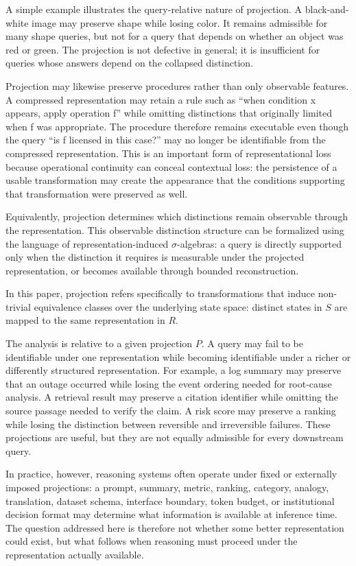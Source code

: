 \documentclass[11pt]{article}
\begin{document}
A simple example illustrates the query-relative nature of projection. A black-and-white image may preserve shape while losing color. It remains admissible for many shape queries, but not for a query that depends on whether an object was red or green. The projection is not defective in general; it is insufficient for queries whose answers depend on the collapsed distinction.

Projection may likewise preserve procedures rather than only observable features. A compressed representation may retain a rule such as “when condition x appears, apply operation f” while omitting distinctions that originally limited when f was appropriate. The procedure therefore remains executable even though the query “is f licensed in this case?” may no longer be identifiable from the compressed representation. This is an important form of representational loss because operational continuity can conceal contextual loss: the persistence of a usable transformation may create the appearance that the conditions supporting that transformation were preserved as well.

Equivalently, projection determines which distinctions remain observable through the representation. This observable distinction structure can be formalized using the language of representation-induced $\sigma$-algebras: a query is directly supported only when the distinction it requires is measurable under the projected representation, or becomes available through bounded reconstruction.

In this paper, projection refers specifically to transformations that induce non-trivial equivalence classes over the underlying state space: distinct states in $S$ are mapped to the same representation in $R$.

The analysis is relative to a given projection $P$. A query may fail to be identifiable under one representation while becoming identifiable under a richer or differently structured representation. For example, a log summary may preserve that an outage occurred while losing the event ordering needed for root-cause analysis. A retrieval result may preserve a citation identifier while omitting the source passage needed to verify the claim. A risk score may preserve a ranking while losing the distinction between reversible and irreversible failures. These projections are useful, but they are not equally admissible for every downstream query.

In practice, however, reasoning systems often operate under fixed or externally imposed projections: a prompt, summary, metric, ranking, category, analogy, translation, dataset schema, interface boundary, token budget, or institutional decision format may determine what information is available at inference time. The question addressed here is therefore not whether some better representation could exist, but what follows when reasoning must proceed under the representation actually available.
\end{document}
